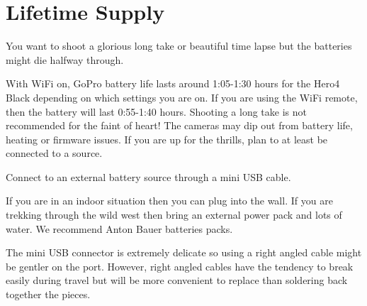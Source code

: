 \section{Lifetime Supply}
\pagecolor{white}
\label{chap:8}
\begin{fullwidth}

\problem

{\large You want to shoot a glorious long take or beautiful time lapse but the batteries might die halfway through. \par}

With WiFi on, GoPro battery life lasts around 1:05-1:30 hours for the Hero4 Black depending on which settings you are on. If you are using the WiFi remote, then the battery will last 0:55-1:40 hours. Shooting a long take is not recommended for the faint of heart! The cameras may dip out from battery life, heating or firmware issues. If you are up for the thrills, plan to at least be connected to a source. 


\solution

{\large Connect to an external battery source through a mini USB cable. \par}

If you are in an indoor situation then you can plug into the wall. If you are trekking through the wild west then bring an external power pack and lots of water. We recommend Anton Bauer batteries packs.


\tip The mini USB connector is extremely delicate so using a right angled cable might be gentler on the port. However, right angled cables have the tendency to break easily during travel but will be more convenient to replace than soldering back together the pieces. 





\clearpage
\end{fullwidth}
